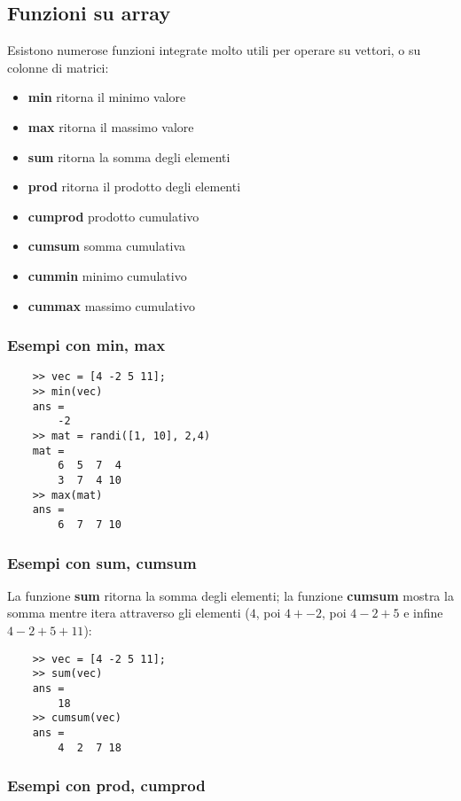 \documentclass[a4paper, 10pt]{article}
\begin{document}
\subsection{Funzioni su array}
Esistono numerose funzioni integrate molto utili per operare su vettori, o su colonne di matrici:
\begin{itemize}
\item \textbf{min} ritorna il minimo valore
\item \textbf{max} ritorna il massimo valore
\item \textbf{sum} ritorna la somma degli elementi
\item \textbf{prod} ritorna il prodotto degli elementi
\item \textbf{cumprod} prodotto cumulativo
\item \textbf{cumsum} somma cumulativa
\item \textbf{cummin} minimo cumulativo
\item \textbf{cummax} massimo cumulativo
\end{itemize} 

\subsubsection{Esempi con min, max}

\begin{lstlisting}
	>> vec = [4 -2 5 11];
	>> min(vec)
	ans =
		-2
	>> mat = randi([1, 10], 2,4)
	mat =
		6  5  7  4
		3  7  4 10
	>> max(mat)
	ans =
		6  7  7 10
\end{lstlisting}

\subsubsection{Esempi con sum, cumsum}

La funzione \textbf{sum} ritorna la somma degli elementi; la funzione \textbf{cumsum} mostra la somma mentre itera attraverso gli elementi ($4$, poi $4+-2$, poi $4-2+5$ e infine $4-2+5+11$):

\begin{lstlisting}
	>> vec = [4 -2 5 11];
	>> sum(vec)
	ans =
		18
	>> cumsum(vec)
	ans =
		4  2  7 18
\end{lstlisting}

\subsubsection{Esempi con prod, cumprod}
\end{document}
